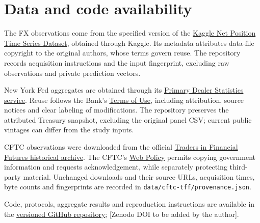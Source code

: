\section*{Data and code availability}
The FX observations come from the specified version of the \href{https://www.kaggle.com/datasets/davidlindsay1979/net-position-time-series-dataset}{Kaggle Net Position Time Series Dataset}, obtained through Kaggle. Its metadata attributes data-file copyright to the original authors, whose terms govern reuse. The repository records acquisition instructions and the input fingerprint, excluding raw observations and private prediction vectors.

New York Fed aggregates are obtained through its \href{https://www.newyorkfed.org/markets/counterparties/primary-dealers-statistics}{Primary Dealer Statistics service}. Reuse follows the Bank's \href{https://www.newyorkfed.org/privacy/termsofuse.html}{Terms of Use}, including attribution, source notices and clear labeling of modifications. The repository preserves the attributed Treasury snapshot, excluding the original panel CSV; current public vintages can differ from the study inputs.

CFTC observations were downloaded from the official \href{https://www.cftc.gov/MarketReports/CommitmentsofTraders/HistoricalCompressed/index.htm}{Traders in Financial Futures historical archive}. The CFTC's \href{https://www.cftc.gov/sites/default/files/cftc/cftcprivacy.htm}{Web Policy} permits copying government information and requests acknowledgement, while separately protecting third-party material. Unchanged downloads and their source URLs, acquisition times, byte counts and fingerprints are recorded in \texttt{data/cftc-tff/provenance.json}.

Code, protocols, aggregate results and reproduction instructions are available in the \href{https://github.com/ByronLi0207/financial-mathematics-paper-20261020/tree/submission-final}{versioned GitHub repository}; [Zenodo DOI to be added by the author].

